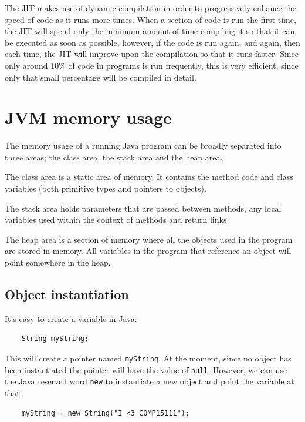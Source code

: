 The JIT makes use of dynamic compilation in order to progressively enhance the
speed of code as it runs more times. When a section of code is run the first
time, the JIT will spend only the minimum amount of time compiling it so that it
can be executed as soon as possible, however, if the code is run again, and
again, then each time, the JIT will improve upon the compilation so that it runs
faster. Since only around 10\% of code in programs is run frequently, this is
very efficient, since only that small percentage will be compiled in detail.

\section{JVM memory usage}

The memory usage of a running Java program can be broadly separated into three
areas; the class area, the stack area and the heap area.

The class area is a static area of memory. It contains the method code and
class variables (both primitive types and pointers to objects).

The stack area holds parameters that are passed between methods, any local
variables used within the context of methods and return links.

The heap area is a section of memory where all the objects used in the program
are stored in memory. All variables in the program that reference an object
will point somewhere in the heap.


\subsection{Object instantiation}

It's easy to create a variable in Java:

\begin{verbatim}
	String myString;
\end{verbatim}

This will create a pointer named {\tt myString}. At the moment, since no
object has been instantiated the pointer will have the value of {\tt null}.
However, we can use the Java reserved word {\tt new} to instantiate a new
object and point the variable at that:

\begin{verbatim}
	myString = new String("I <3 COMP15111");
\end{verbatim}

